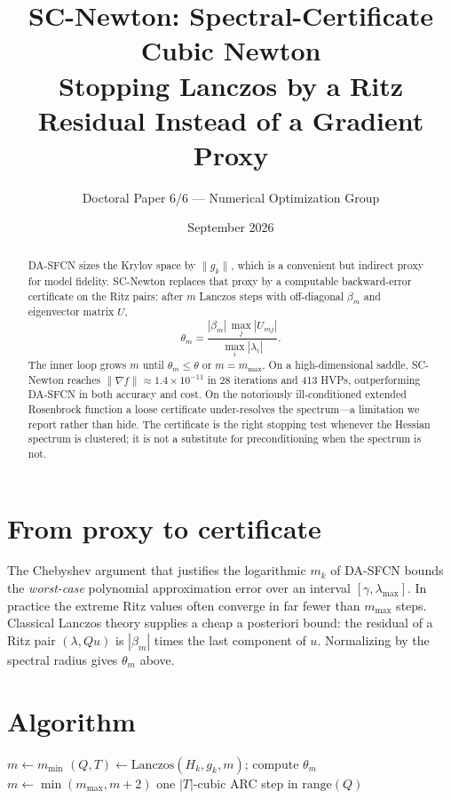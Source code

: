 \documentclass[11pt,a4paper]{article}
\title{\textbf{SC-Newton: Spectral-Certificate Cubic Newton}\\
\large Stopping Lanczos by a Ritz Residual Instead of a Gradient Proxy}
\author{Doctoral Paper 6/6 --- Numerical Optimization Group}
\date{September 2026}
\begin{document}
\maketitle
\begin{abstract}
DA-SFCN sizes the Krylov space by $\|g_k\|$, which is a convenient but
indirect proxy for model fidelity. SC-Newton replaces that proxy by a
computable backward-error certificate on the Ritz pairs: after $m$
Lanczos steps with off-diagonal $\beta_m$ and eigenvector matrix $U$,
\[
\theta_m=\frac{|\beta_m|\,\max_j|U_{mj}|}{\max_i|\lambda_i|}.
\]
The inner loop grows $m$ until $\theta_m\le\theta$ or $m=m_{\max}$.
On a high-dimensional saddle, SC-Newton reaches
$\|\nabla f\|\approx 1.4\times 10^{-11}$ in 28 iterations and 413 HVPs,
outperforming DA-SFCN in both accuracy and cost. On the notoriously
ill-conditioned extended Rosenbrock function a loose certificate
under-resolves the spectrum---a limitation we report rather than hide.
The certificate is the right stopping test whenever the Hessian spectrum
is clustered; it is not a substitute for preconditioning when the
spectrum is not.
\end{abstract}

\section{From proxy to certificate}
The Chebyshev argument that justifies the logarithmic $m_k$ of DA-SFCN
bounds the \emph{worst-case} polynomial approximation error over an
interval $[\gamma,\lambda_{\max}]$. In practice the extreme Ritz values
often converge in far fewer than $m_{\max}$ steps. Classical Lanczos
theory \cite{saad2003} supplies a cheap a posteriori bound: the residual
of a Ritz pair $(\lambda,Qu)$ is $|\beta_m|$ times the last component of
$u$. Normalizing by the spectral radius gives $\theta_m$ above.

\section{Algorithm}
\begin{algorithm}[h]
\caption{SC-Newton (inner loop at iteration $k$)}
\begin{algorithmic}[1]
\State $m\gets m_{\min}$
\Repeat
  \State $(Q,T)\gets\mathrm{Lanczos}(H_k,g_k,m)$; compute $\theta_m$
  \State $m\gets\min(m_{\max},m+2)$
\State one $|T|$-cubic ARC step in $\mathrm{range}(Q)$
\end{algorithmic}
\end{algorithm}
\end{document}
